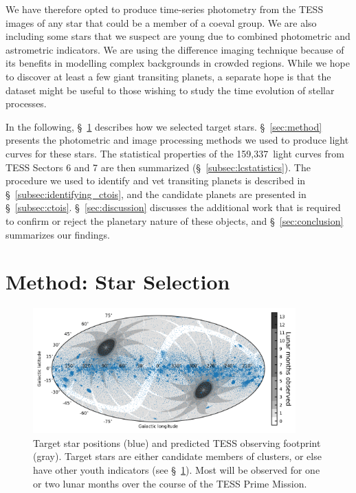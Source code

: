 \documentclass[12pt,twocolumn,tighten]{aastex62}
\newcommand{\numberlcs}{159{,}337\ } %
\begin{document}
We have therefore opted to produce time-series photometry from the
TESS images of any star that could be a member of a coeval group.  We
are also including some stars that we suspect are young due to
combined photometric and astrometric indicators.  We are using the
difference imaging technique because of its benefits in modelling
complex backgrounds in crowded regions.  While we hope to discover at
least a few giant transiting planets, a separate hope is that the
dataset might be useful to those wishing to study the time evolution
of stellar processes.

In the following, \S~\ref{sec:starselection} describes how we selected
target stars. \S~\ref{sec:method} presents the photometric and image
processing methods we used to produce light curves for these stars.
The statistical properties of the \numberlcs light curves from TESS Sectors
6 and 7 are then summarized (\S~\ref{subsec:lcstatistics}).  The
procedure we used to identify and vet transiting planets is
described in \S~\ref{subsec:identifying_ctois}, and the candidate
planets are presented in \S~\ref{subsec:ctois}.
\S~\ref{sec:discussion} discusses the additional work that is required
to confirm or reject the planetary nature of these objects, and
\S~\ref{sec:conclusion} summarizes our findings.


\section{Method: Star Selection}
\label{sec:starselection}

\begin{figure}[!t]
	\begin{center}
		\leavevmode
		\includegraphics[width=0.9\textwidth]{target_star_positions.png}
	\end{center}
	\vspace{-0.8cm}
	\caption{
    Target star positions (blue) and predicted TESS
    observing footprint (gray).
    Target stars are either candidate members of clusters, or
    else have other youth indicators (see \S~\ref{sec:starselection}).
    Most will be observed for one or two lunar months over the course
    of the TESS Prime Mission.
    \label{fig:cdips_targets_positions}
	}
\end{figure}
\end{document}
